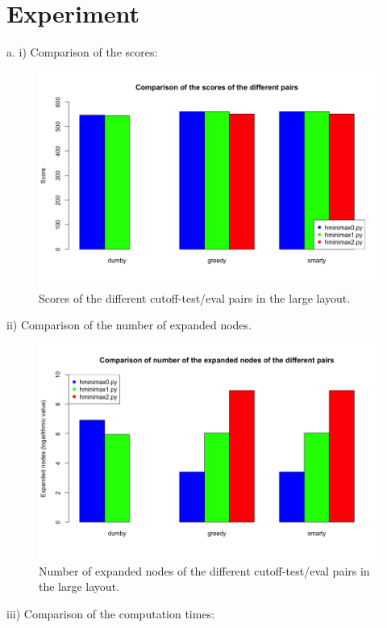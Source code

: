 \documentclass{article}
\begin{document}
\section{Experiment}
a.
	i) Comparison of the scores:
		\begin{figure}[H]
			\centering
			\includegraphics[scale=0.45]{plots/3a_scores.png}
			\caption{Scores of the different cutoff-test/eval pairs in the large layout.}
		\end{figure}
	ii) Comparison of the number of expanded nodes.
		\begin{figure}[H]
			\centering
			\includegraphics[scale=0.45]{plots/3a_nodes.png} 
			\caption{Number of expanded nodes of the different cutoff-test/eval pairs in the large layout.}
		\end{figure}
	iii) Comparison of the computation times:
\end{document}
